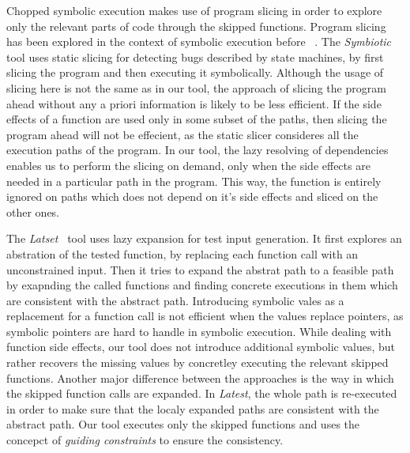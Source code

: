 Chopped symbolic execution makes use of program slicing in order to
explore only the relevant parts of code through the skipped functions.
Program slicing has been explored in the context of symbolic execution before ~\cite{babic11,slaby2013symbiotic}.
The \textit{Symbiotic}~\cite{slaby2013symbiotic} tool uses static slicing for
detecting bugs described by state machines,
by first slicing the program and then executing it symbolically.
Although the usage of slicing here is not the same as in our tool,
the approach of slicing the program ahead without any a priori information is likely to be less efficient.
If the side effects of a function are used only in some subset of the paths,
then slicing the program ahead will not be effecient,
as the static slicer consideres all the execution paths of the program.
In our tool, the lazy resolving of dependencies enables us to perform the slicing on demand,
only when the side effects are needed in a particular path in the program.
This way, the function is entirely ignored on paths which does not depend on it's side effects
and sliced on the other ones.

The \textit{Latset}~\cite{majumdar2007latest} tool uses lazy expansion for test input generation.
It first explores an abstration of the tested function,
by replacing each function call with an unconstrained input.
Then it tries to expand the abstrat path to a feasible path
by exapnding the called functions and finding concrete executions in them
which are consistent with the abstract path.
Introducing symbolic vales as a replacement for a function call
is not efficient when the values replace pointers,
as symbolic pointers are hard to handle in symbolic execution.
While dealing with function side effects,
our tool does not introduce additional symbolic values,
but rather recovers the missing values by concretley executing the relevant skipped functions.
Another major difference between the approaches is the way in which
the skipped function calls are expanded.
In \textit{Latest}, the whole path is re-executed in order to make sure that the
localy expanded paths are consistent with the abstract path.
Our tool executes only the skipped functions
and uses the concepct of \textit{guiding constraints} to ensure the consistency.


